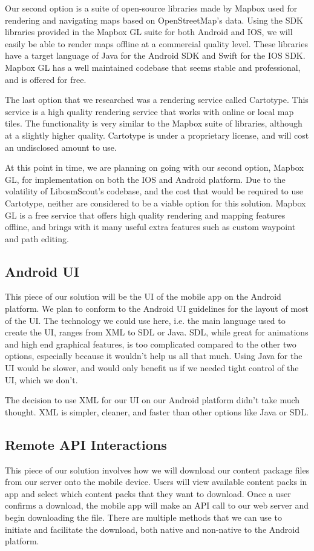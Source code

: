 \documentclass[letterpaper, 10pt,titlepage]{article}
\begin{document}
Our second option is a suite of open-source libraries made by Mapbox used for rendering and navigating maps based on OpenStreetMap’s data. Using the SDK libraries provided in the Mapbox GL suite for both Android and IOS, we will easily be able to render maps offline at a commercial quality level. These libraries have a target language of Java for the Android SDK and Swift for the IOS SDK. Mapbox GL has a well maintained codebase that seems stable and professional, and is offered for free. 


The last option that we researched was a rendering service called Cartotype. This service is a high quality rendering service that works with online or local map tiles. The functionality is very similar to the Mapbox suite of libraries, although at a slightly higher quality. Cartotype is under a proprietary license, and will cost an undisclosed amount to use. 


At this point in time, we are planning on going with our second option, Mapbox GL, for implementation on both the IOS and Android platform. Due to the volatility of LibosmScout’s codebase, and the cost that would be required to use Cartotype, neither are considered to be a viable option for this solution. Mapbox GL is a free service that offers high quality rendering and mapping features offline, and brings with it many useful extra features such as custom waypoint and path editing.

\subsection{Android UI}
This piece of our solution will be the UI of the mobile app on the Android platform. We plan to conform to the Android UI guidelines for the layout of most of the UI. The technology we could use here, i.e. the main language used to create the UI, ranges from XML to SDL or Java. SDL, while great for animations and high end graphical features, is too complicated compared to the other two options, especially because it wouldn't help us all that much. Using Java for the UI would be slower, and would only benefit us if we needed tight control of the UI, which we don’t. 


The decision to use XML for our UI on our Android platform didn’t take much thought. XML is simpler, cleaner, and faster than other options like Java or SDL. 

\subsection{Remote API Interactions}
This piece of our solution involves how we will download our content package files from our server onto the mobile device. Users will view available content packs in app and select which content packs that they want to download. Once a user confirms a download, the mobile app will make an API call to our web server and begin downloading the file. There are multiple methods that we can use to initiate and facilitate the download, both native and non-native to the Android platform. 
\end{document}
